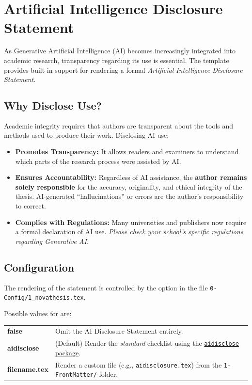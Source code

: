\chapter{Artificial Intelligence Disclosure Statement}
\label{chap:aidisclose}

As Generative Artificial Intelligence (\gls{AI}) becomes increasingly integrated into academic research, transparency regarding its use is essential. The \novathesis{} template provides built-in support for rendering a formal \emph{Artificial Intelligence Disclosure Statement}.

\section{Why Disclose  Use?}

Academic integrity requires that authors are transparent about the tools and methods used to produce their work. Disclosing \gls{AI} use:
\begin{itemize}
  \item \textbf{Promotes Transparency:} It allows readers and examiners to understand which parts of the research process were assisted by \gls{AI}.
  \item \textbf{Ensures Accountability:} Regardless of \gls{AI} assistance, the \textbf{author remains solely responsible} for the accuracy, originality, and ethical integrity of the thesis. \gls{AI}-generated “hallucinations” or errors are the author's responsibility to correct.
  \item \textbf{Complies with Regulations:} Many universities and publishers now require a formal declaration of \gls{AI} use. \emph{Please check your school's specific regulations regarding Generative \gls{AI}.}
\end{itemize}


\section{Configuration}

The rendering of the statement is controlled by the  option in the file \verb!0-Config/1_novathesis.tex!.

Possible values for  are:

\medskip
\noindent
\begin{tabularx}{\textwidth}{>{\bfseries\ttfamily}lX}
  \toprule
    false & Omit the AI Disclosure Statement entirely.\\
    aidisclose & (Default) Render the \emph{standard} checklist using the \href{https://github.com/joaomlourenco/aidisclose}{\texttt{aidisclose} package}.\\
    filename.tex & Render a custom file (e.g., \texttt{aidisclosure.tex}) from the \texttt{1-FrontMatter/} folder.\\
  \bottomrule
\end{tabularx}


